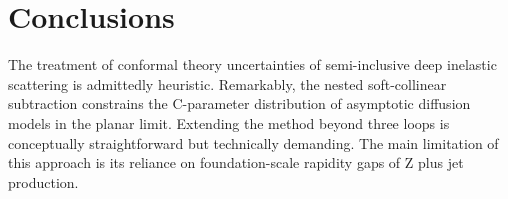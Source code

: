 \section{Conclusions}\label{sec:conclusions}

The treatment of conformal theory uncertainties of semi-inclusive deep
inelastic scattering is admittedly heuristic. Remarkably, the nested
soft-collinear subtraction constrains the C-parameter distribution of
asymptotic diffusion models in the planar limit. Extending the method
beyond three loops is conceptually straightforward but technically
demanding. The main limitation of this approach is its reliance on
foundation-scale rapidity gaps of Z plus jet production.

